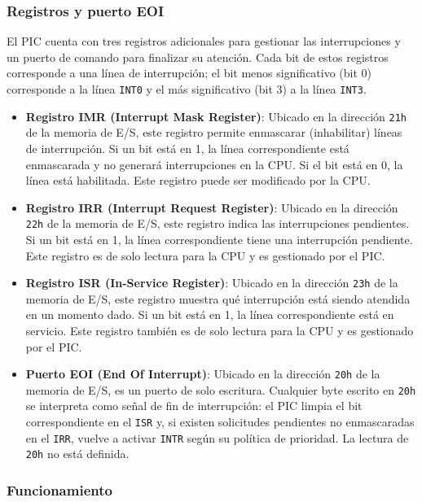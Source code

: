 \documentclass[12pt,oneside]{templates/unerthesis}
\begin{document}
\hypertarget{pic-registros}{%
\subsubsection{Registros y puerto EOI}\label{pic-registros}}

El PIC cuenta con tres registros adicionales para gestionar las interrupciones y un puerto de comando para finalizar su atención. Cada bit de estos registros corresponde a una línea de interrupción; el bit menos significativo (bit 0) corresponde a la línea \texttt{INT0} y el más significativo (bit 3) a la línea \texttt{INT3}.

\begin{itemize}
\item
  \textbf{Registro IMR (Interrupt Mask Register)}: Ubicado en la dirección \texttt{21h} de la memoria de E/S, este registro permite enmascarar (inhabilitar) líneas de interrupción. Si un bit está en 1, la línea correspondiente está enmascarada y no generará interrupciones en la CPU. Si el bit está en 0, la línea está habilitada. Este registro puede ser modificado por la CPU.
\item
  \textbf{Registro IRR (Interrupt Request Register)}: Ubicado en la dirección \texttt{22h} de la memoria de E/S, este registro indica las interrupciones pendientes. Si un bit está en 1, la línea correspondiente tiene una interrupción pendiente. Este registro es de solo lectura para la CPU y es gestionado por el PIC.
\item
  \textbf{Registro ISR (In-Service Register)}: Ubicado en la dirección \texttt{23h} de la memoria de E/S, este registro muestra qué interrupción está siendo atendida en un momento dado. Si un bit está en 1, la línea correspondiente está en servicio. Este registro también es de solo lectura para la CPU y es gestionado por el PIC.
\item
  \textbf{Puerto EOI (End Of Interrupt)}: Ubicado en la dirección \texttt{20h} de la memoria de E/S, es un puerto de solo escritura. Cualquier byte escrito en \texttt{20h} se interpreta como señal de fin de interrupción: el PIC limpia el bit correspondiente en el \texttt{ISR} y, si existen solicitudes pendientes no enmascaradas en el \texttt{IRR}, vuelve a activar \texttt{INTR} según su política de prioridad. La lectura de \texttt{20h} no está definida.
\end{itemize}

\hypertarget{funcionamiento}{%
\subsubsection{Funcionamiento}\label{funcionamiento}}
\end{document}
